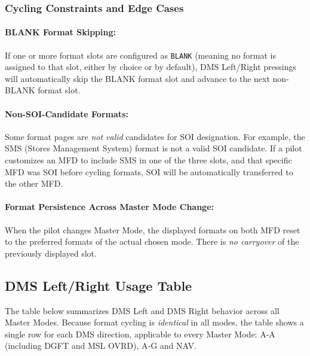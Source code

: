 \documentclass[11pt, a4paper, twoside]{report}
\begin{document}
\subsubsection{Cycling Constraints and Edge Cases}
\label{sec:C4-S4-S2-S4}

\paragraph{BLANK Format Skipping:}

If one or more format slots are configured as \texttt{BLANK} (meaning no format is assigned to that slot, either by choice or by default), DMS Left/Right pressings will automatically skip the BLANK format slot and advance to the next non-BLANK format slot.

\paragraph{Non-SOI-Candidate Formats:}

Some format pages are \textit{not valid} candidates for SOI designation. For example, the SMS (Stores Management System) format is not a valid SOI candidate. If a pilot customizes an MFD to include SMS in one of the three slots, and that specific MFD was SOI before cycling formats, SOI will be automatically transferred to the other MFD.

\paragraph{Format Persistence Across Master Mode Change:}

When the pilot changes Master Mode, the displayed formats on both MFD reset to the preferred formats of the actual chosen mode. There is \textit{no carryover} of the previously displayed slot.


\subsection{DMS Left/Right Usage Table}
\label{sec:C4-S4-S3}

The table below summarizes DMS Left and DMS Right behavior across all Master Modes. Because format cycling is \textit{identical} in all modes, the table shows a single row for each DMS direction, applicable to every Master Mode: A-A (including DGFT and MSL OVRD), A-G and NAV.
\end{document}
